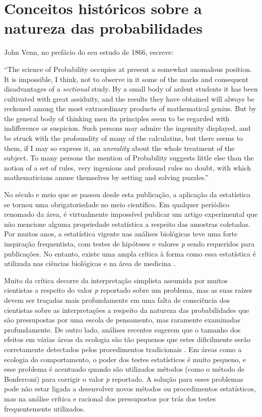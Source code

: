 \section{Conceitos históricos sobre a natureza das probabilidades}

John Venn, no prefácio do seu estudo de 1866, escreve:

``The science of Probability occupies at present a somewhat anomalous position. It is impossible, I think, not to observe
in it some of the marks and consequent disadvantages of a {\em sectional} study. By a small body of ardent students it
has been cultivated with great assiduity, and the results they have obtained will always be reckoned among the most 
extraordinary products of mathematical genius. But by the general body of thinking men its principles seem to be regarded
with indifference or suspicion. Such persons may admire the ingenuity displayed, and be struck with the profoundity
of many of the calculatins, but there seems to them, if I may so express it, an {\em unreality} about the whole treatment
of the subject. To many persons the mention of Probability suggests little else than the notion of a set of rules, very
ingenious and profound rules no doubt, with which mathematicians amuse themselves by setting and solving puzzles.''
\citep{Venn1866}

No século e meio que se passou desde esta publicação, a aplicação da estatística se tornou uma obrigatoriedade no meio científico.
Em qualquer periódico renomado da área, é virtualmente impossível publicar um artigo experimental que não 
mencione alguma propriedade
estatística a respeito das amostras coletadas. Por muitos anos, a estatística vigente nas análises biológicas teve uma
forte inspiração frequentista, com testes de hipóteses e valores {\em p} sendo requeridos para publicações. 
No entanto, existe uma ampla crítica à forma como essa estatística é
utilizada nas ciências biológicas e na área de medicina \citep{Ioannidis05}.

Muito da crítica decorre da interpretação
simplista assumida por muitos cientistas a respeito do valor {\em p} reportado sobre um problema, mas as suas raízes devem
ser traçadas mais profundamente em uma falta de consciência dos cientistas sobre as interpretações a respeito da natureza
das probabilidades que são pressupostas por uma escola de pensamento, mas raramente examinadas profundamente. 
De outro lado, análises recentes sugerem que o tamanho dos efeitos em várias áreas da ecologia são tão pequenos que estes
dificilmente serão corretamente detectados pelos procedimentos tradicionais \citep{Jennions03}. Em áreas como a ecologia do
comportamento, o poder dos testes estatísticos é muito pequeno, e esse problema é acentuado quando são utilizados métodos
(como o método de Bonferroni) para corrigir o valor {\em p} reportado. A solução para esses problemas pode não estar ligada
a desenvolver novos métodos ou procedimentos estatísticos, mas na análise crítica e racional dos pressupostos por trás
dos testes frequentemente utilizados.

